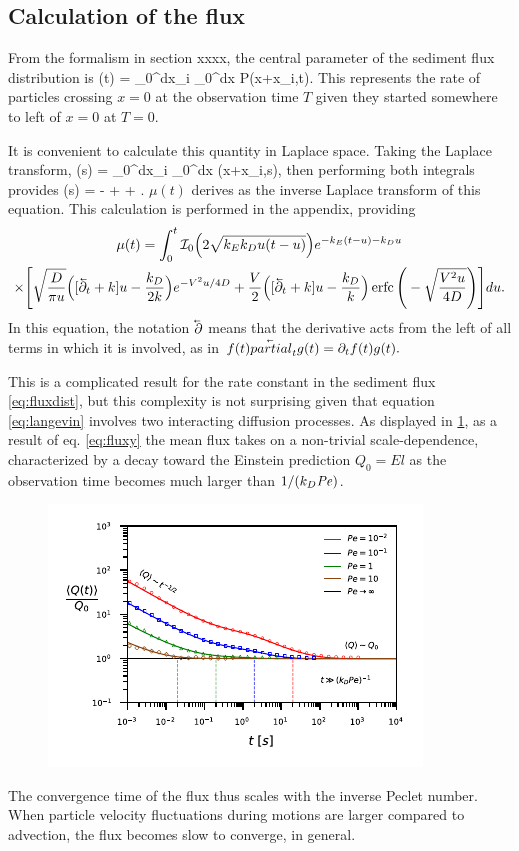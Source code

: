 \subsection{Calculation of the flux}

From the formalism in section xxxx, the central parameter of the sediment flux distribution is 
\be \mu(t) = \rho \int_0^\infty dx_i \int_0^\infty dx P(x+x_i,t).\ee
This represents the rate of particles crossing $x=0$ at the observation time $T$ given they started somewhere to left of $x=0$ at $T=0$.

It is convenient to calculate this quantity in Laplace space.   
Taking the Laplace transform,
\be \tilde{\mu}(s) = \rho \int_0^\infty dx_i \int_0^\infty dx (x+x_i,s),\ee
then performing both integrals provides
\be  \tilde{\mu}(s) = - +  + . \label{eq:laplacefluxrate}\ee
$\mu(t)$ derives as the inverse Laplace transform of this equation. 
This calculation is performed in the appendix, providing
\begin{multline} 
\mu(t) = \int_0^t \mathcal{I}_0\Big(2\sqrt{k_Ek_Du(t-u)}\Big)e^{-k_E(t-u)-k_D u} \\
\times \Bigg[\sqrt{\frac{D}{\pi u}}\Big([\cev{\partial_t} + k]u-\frac{k_D}{2 k}\Big)e^{-V^2 u/4D} + \frac{V}{2}\Big([\cev{\partial_t} + k]u -\frac{k_D}{k}\Big) \erfc\Bigg(-\sqrt{\frac{V^2 u}{4D}}\Bigg)\Bigg] du. \label{eq:fluxy}
\end{multline}
In this equation, the notation $\cev{\partial}$ means that the derivative acts from the left of all terms in which it is involved, as in $f(t)\cev{partial}_t g(t) = \partial_t f(t)g(t).$

This is a complicated result for the rate constant in the sediment flux \ref{eq:fluxdist}, but this complexity is not surprising given that equation \ref{eq:langevin} involves two interacting diffusion processes. As displayed in \ref{fig:fig3}, as a result of eq. \ref{eq:fluxy} the mean flux takes on a non-trivial scale-dependence, characterized by a decay toward the Einstein prediction $Q_0 = E l$ as the observation time becomes much larger than $1/(k_D \mbox{\textit{Pe}})$. 
\begin{figure}
	\centerline{\includegraphics{figures/ch2/figure3_slopeKey.pdf}}
	\caption{}
	\label{fig:fig3}
\end{figure}
The convergence time of the flux thus scales with the inverse Peclet number. When particle velocity fluctuations during motions are larger compared to advection, the flux becomes slow to converge, in general. 

